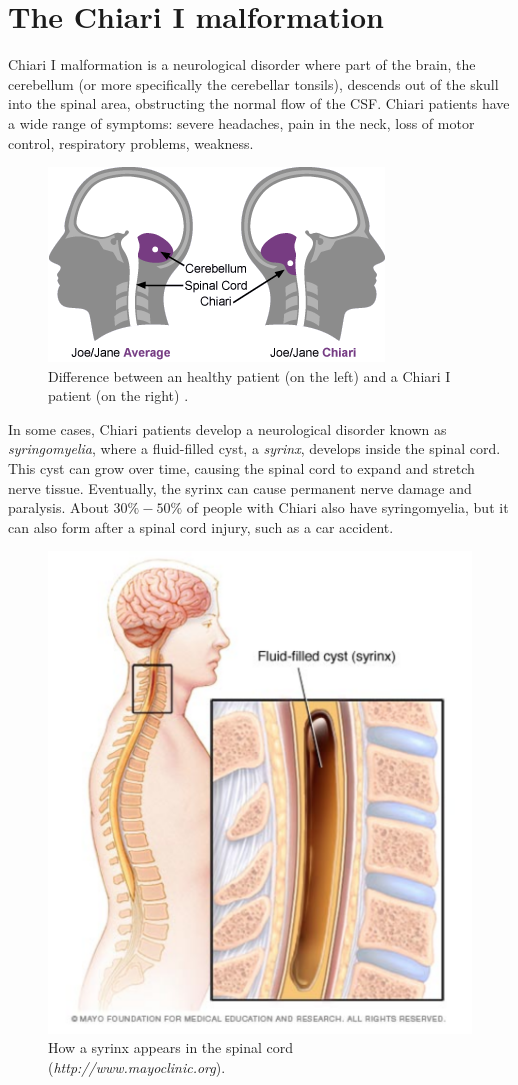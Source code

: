 \documentclass[a4paper,11pt,oneside]{book}
\begin{document}
\section{The Chiari I malformation}
\label{chiariI}

Chiari I malformation is a neurological disorder where part of the brain, the cerebellum (or more specifically the cerebellar tonsils), descends out of the skull into the spinal area, obstructing the normal flow of the CSF. Chiari patients have a wide range of symptoms: severe headaches, pain in the neck, loss of motor control, respiratory problems, weakness. 

\begin{figure}[h!]
\centering
\includegraphics[width=.6\textwidth]{images/chiari}
\caption{Difference between an healthy patient (on the left) and a Chiari I patient (on the right) \cite{chiari}.}
\label{img:cns:4}
\end{figure}

In some cases, Chiari patients develop a neurological disorder known as \emph{syringomyelia}, where a fluid-filled cyst, a \emph{syrinx}, develops inside the spinal cord. This cyst can grow over time, causing the spinal cord to expand and stretch nerve tissue. Eventually, the syrinx can cause permanent nerve damage and paralysis. About $30\%-50\%$ of people with Chiari also have syringomyelia, but it can also form after a spinal cord injury, such as a car accident.

\begin{figure}[h!]
\centering
\includegraphics[width=.6\textwidth]{images/syrinx}
\caption{How a syrinx appears in the spinal cord (\emph{http://www.mayoclinic.org}).}
\label{img:cns:5}
\end{figure}
\end{document}
